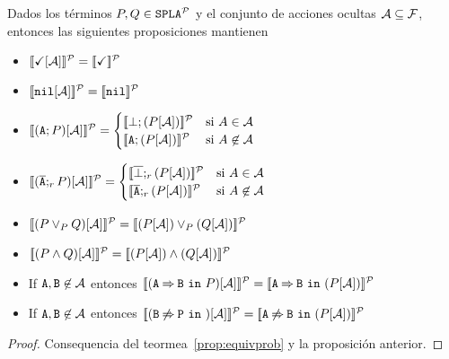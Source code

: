 \begin{proposition}
  Dados los términos $P,Q\in\mathtt{SPLA{^{\cal P}}}$ y el conjunto de acciones ocultas ${\cal A}\subseteq{\cal F}$, entonces
  las siguientes proposiciones mantienen
  \begin{itemize}
  \item $[\![\checkmark[{\cal A}]]\!]^{\cal P}=[\![\checkmark]\!]^{\cal P}$
  \item $[\![\mathtt{nil}[{\cal A}]]\!]^{\cal P}=[\![\mathtt{nil}]\!]^{\cal P}$
  \item
      $\semdenp{(\fA;P)\hide\calA}=
      \begin{cases}
        \semdenp{\bot;(P\hide\calA)} & \mbox{si } A\in\calA\\
        \semdenp{\fA;(P\hide\calA)} & \mbox{si } A\not\in\calA\\
      \end{cases}$
  \item
      $\semdenp{(\ofA;_rP)\hide\calA}=
      \begin{cases}
        \semdenp{\overline{\bot};_r(P\hide\calA)} & \mbox{si } A\in\calA\\
        \semdenp{\ofA;_r(P\hide\calA)} & \mbox{si } A\not\in\calA\\
      \end{cases}$
  \item $[\![(P\mathbin{\lor}_P Q)[{\cal A}]]\!]^{\cal P}=[\![(P[{\cal A}])\mathbin{\lor}_P (Q[{\cal A}])]\!]^{\cal P}$
  \item $[\![(P\mathbin{\wedge} Q)[{\cal A}]]\!]^{\cal P}=[\![(P[{\cal A}])\mathbin{\wedge} (Q[{\cal A}])]\!]^{\cal P}$
  \item If ${\mathtt{A}},{\mathtt{B}}\not\in{\cal A}$ entonces 
    $[\![(\mathtt{A}\mathbin{\Rightarrow}\mathtt{B}\ \mathtt{in}\ P)[{\cal A}]]\!]^{\cal P}=[\![\mathtt{A}\mathbin{\Rightarrow}\mathtt{B}\ \mathtt{in}\ (P[{\cal A}])]\!]^{\cal P}$
  \item If ${\mathtt{A}},{\mathtt{B}}\not\in{\cal A}$ entonces 
    $[\![(\mathtt{B}\mathbin{\not\Rightarrow}\mathtt{P}\ \mathtt{in}\ )[{\cal A}]]\!]^{\cal P}=[\![\mathtt{A}\mathbin{\not\Rightarrow}\mathtt{B}\ \mathtt{in}\ (P[{\cal A}])]\!]^{\cal P}$
  \end{itemize}
  \begin{proof}
    Consequencia del teormea~\ref{prop:equivprob} y la
    proposición anterior.
  \end{proof}
\end{proposition}
